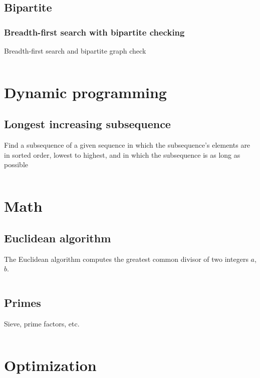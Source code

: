 \documentclass[9pt,a4paper,twocolumn,landscape,oneside]{amsart}
\newcommand{\code}[1]{\inputminted{cpp}{_Code/#1}}
\newif\ifverbose
\begin{document}
  \subsection{Bipartite}
        \subsubsection{Breadth-first search with bipartite checking}
            Breadth-first search and bipartite graph check
            \code{Graphs/bipartite.cpp}

\section{Dynamic programming}
    \subsection{Longest increasing subsequence}
        Find a subsequence of a given sequence in which the subsequence's
        elements are in sorted order, lowest to highest, and in which the
        subsequence is as long as possible
        \code{DynamicProgramming/LIS.cpp}

\section{Math}
    \subsection{Euclidean algorithm}
        The Euclidean algorithm computes the greatest common divisor of two
        integers $a$, $b$.
        \code{Mathematics/gcd.cpp}

    \subsection{Primes}
        Sieve, prime factors, etc.
        \code{Mathematics/primes.cpp}

    \ifverbose
    \subsection{Fraction}
        A fraction (rational number) class. Note that numbers are stored in
        lowest common terms.
        \code{Mathematics/fractions.cpp}
    \fi

\section{Optimization}
\end{document}
